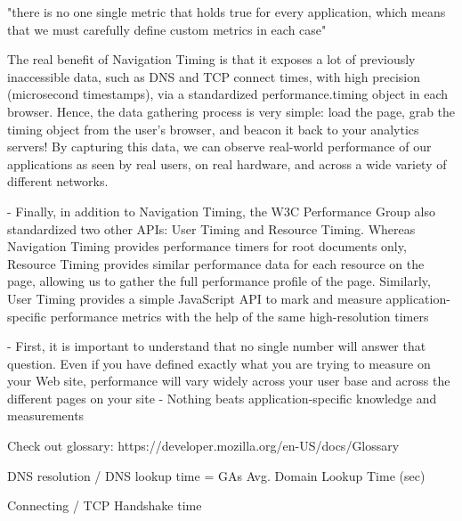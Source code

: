 "there is no one single metric that holds true for every application, which means that we must carefully define custom metrics in each case"

The real benefit of Navigation Timing is that it exposes a lot of previously inaccessible data, such as DNS and TCP connect times, with high precision (microsecond timestamps), via a standardized performance.timing object in each browser. Hence, the data gathering process is very simple: load the page, grab the timing object from the user’s browser, and beacon it back to your analytics servers! By capturing this data, we can observe real-world performance of our applications as seen by real users, on real hardware, and across a wide variety of different networks.

- Finally, in addition to Navigation Timing, the W3C Performance Group also standardized two other APIs: User Timing and Resource Timing. Whereas Navigation Timing provides performance timers for root documents only, Resource Timing provides similar performance data for each resource on the page, allowing us to gather the full performance profile of the page. Similarly, User Timing provides a simple JavaScript API to mark and measure application-specific performance metrics with the help of the same high-resolution timers



- First, it is important to understand that no single number will answer that question. Even if you have defined exactly what you are trying to measure on your Web site, performance will vary widely across your user base and across the different pages on your site
- Nothing beats application-specific knowledge and measurements






Check out glossary: https://developer.mozilla.org/en-US/docs/Glossary



DNS resolution / DNS lookup time %
= GAs Avg. Domain Lookup Time (sec) %


Connecting / TCP Handshake time %


